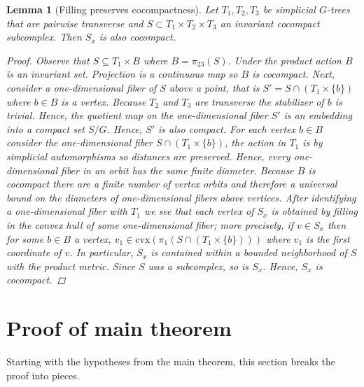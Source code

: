\documentclass[12pt,parskip=full]{report}
\theoremstyle{plain}
\newtheorem{lem}[thm]{Lemma}
\theoremstyle{definition}
\begin{document}
\begin{lem} 
[Filling preserves cocompactness]
\label{lem:fillingcocompact}
    Let $T_1,T_2,T_3$ be simplicial $G$-trees that are pairwise transverse and $S\subset T_1\times T_2\times T_3$ an invariant cocompact subcomplex. Then $S_x$ is also cocompact.
\begin{proof}
    Observe that $S\subseteq T_1\times B$ where $B=\pi_{23}(S)$. Under the product action $B$ is an invariant set. Projection is a continuous map so $B$ is cocompact. Next, consider a one-dimensional fiber of $S$ above a point, that is $S' = S\cap (T_1\times \{b\})$ where $b\in B$ is a vertex. Because $T_2$ and $T_3$ are transverse the stabilizer of $b$ is trivial. Hence, the quotient map on the one-dimensional fiber $S'$ is an embedding into a compact set $S/G$. Hence, $S'$ is also compact. For each vertex $b\in B$ consider the one-dimensional fiber $S\cap (T_1\times \{b\})$, the action in $T_1$ is by simplicial automorphisms so distances are preserved. Hence, every one-dimensional fiber in an orbit has the same finite diameter. Because $B$ is cocompact there are a finite number of vertex orbits and therefore a universal bound on the diameters of one-dimensional fibers above vertices. After identifying a one-dimensional fiber with $T_1$ we see that each vertex of $S_x$ is obtained by filling in the convex hull of some one-dimensional fiber; more precisely, if $v\in S_x$ then for some $b\in B$ a vertex, $v_1\in \text{cvx}(\pi_1(S\cap(T_1\times \{b\})))$ where $v_1$ is the first coordinate of $v$. In particular, $S_x$ is contained within a bounded neighborhood of $S$ with the product metric. Since $S$ was a subcomplex, so is $S_x$. Hence, $S_x$ is cocompact.
\end{proof}
\end{lem}

\chapter{Proof of main theorem}

Starting with the hypotheses from the main theorem, this section breaks the proof into pieces.
\end{document}
